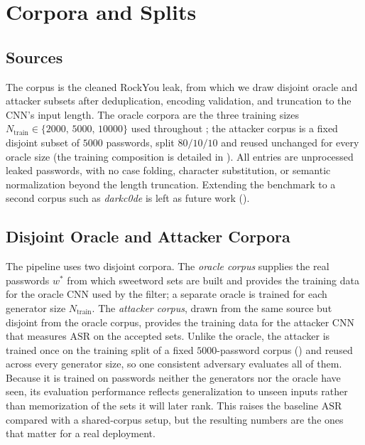 \section{Corpora and Splits}
\label{sec:method-corpora}

\subsection{Sources}

The corpus is the cleaned RockYou leak, from which we draw disjoint
oracle and attacker subsets after deduplication, encoding validation,
and truncation to the CNN's input length. The oracle corpora are the
three training sizes $N_{\text{train}} \in \{2000,\,5000,\,10000\}$ used
throughout ; the attacker corpus is a fixed disjoint
subset of $5000$ passwords, split $80/10/10$ and reused unchanged for
every oracle size (the training composition is detailed in
). All entries are unprocessed leaked passwords,
with no case folding, character substitution, or semantic normalization
beyond the length truncation. Extending the benchmark to a second corpus
such as \emph{darkc0de} is left as future work ().

\subsection{Disjoint Oracle and Attacker Corpora}

The pipeline uses two disjoint corpora. The \emph{oracle corpus}
supplies the real passwords $w^{*}$ from which sweetword sets are built
and provides the training data for the oracle CNN used by the filter; a
separate oracle is trained for each generator size $N_{\text{train}}$.
The \emph{attacker corpus}, drawn from the same source but disjoint from
the oracle corpus, provides the training data for the attacker CNN that
measures $\mathrm{ASR}$ on the accepted sets. Unlike the oracle, the
attacker is trained once on the training split of a fixed
$5000$-password corpus () and reused across every
generator size, so one consistent adversary evaluates all of them.
Because it is trained on passwords neither the generators nor the oracle
have seen, its evaluation performance reflects generalization to unseen
inputs rather than memorization of the sets it will later rank. This
raises the baseline $\mathrm{ASR}$ compared with a shared-corpus setup,
but the resulting numbers are the ones that matter for a real
deployment.

